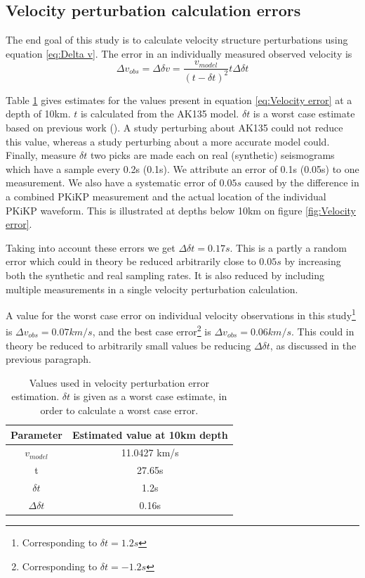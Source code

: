 \documentclass[11pt,a4paper]{article}
\begin{document}
\subsection{Velocity perturbation calculation errors}
The end goal of this study is to calculate velocity structure perturbations using equation \eqref{eq:Delta v}. The error in an individually measured observed velocity is
\begin{equation}
	\Delta v_{obs} = \Delta \delta v = \frac{v_{model}}{\left( t - \delta t\right )^{2}} t\Delta \delta t 
	\label{eq:Velocity error}
\end{equation}

Table \ref{tab:Error values} gives estimates for the values present in equation \eqref{eq:Velocity error} at a depth of 10km. $t$ is calculated from the AK135 model. $\delta t$ is a worst case estimate based on previous work (\cite{Waszek2011a}). A study perturbing about AK135 could not reduce this value, whereas a study perturbing about a more accurate model could. Finally, measure $\delta t$ two picks are made each on real (synthetic) seismograms which have a sample every 0.2s (0.1s). We attribute an error of 0.1s (0.05s) to one measurement. We also have a systematic error of $0.05s$ caused by the difference in a combined PKiKP measurement and the actual location of the individual PKiKP waveform. This is illustrated at depths below 10km on figure \ref{fig:Velocity error}.

Taking into account these errors we get $\Delta \delta t = 0.17s$. This is a partly a random error which could in theory be reduced arbitrarily close to $0.05s$ by increasing both the synthetic and real sampling rates. It is also reduced by including multiple measurements in a single velocity perturbation calculation.

A value for the worst case error on individual velocity observations in this study\footnote{Corresponding to $\delta t = 1.2s$} is $\Delta v_{obs} = 0.07 km/s$, and the best case error\footnote{Corresponding to $\delta t = -1.2s$} is $\Delta v_{obs} = 0.06 km/s$. This could in theory be reduced to arbitrarily small values be reducing $\Delta \delta t$, as discussed in the previous paragraph.

\begin{table}
\centering
\begin{tabular}{| c | c |}
	\hline
	Parameter		& Estimated value at 10km depth	\\ \hline \hline
	$v_{model}$	& 11.0427 km/s					\\ \hline
	t			& 27.65s						\\ \hline
	$\delta t$		& 1.2s						\\ \hline
	$\Delta \delta t$	& 0.16s						\\				
	\hline
\end{tabular}
\caption{Values used in velocity perturbation error estimation. $\delta t$ is given as a worst case estimate, in order to calculate a worst case error.}
\label{tab:Error values}
\end{table}
\end{document}
